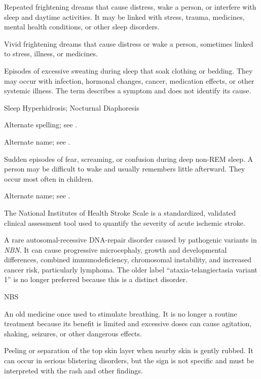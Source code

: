  Repeated frightening dreams that cause distress, wake a person, or interfere with sleep and daytime activities. It may be linked with stress, trauma, medicines, mental health conditions, or other sleep disorders.

 Vivid frightening dreams that cause distress or wake a person, sometimes linked to stress, illness, or medicines.

 Episodes of excessive sweating during sleep that soak clothing or bedding. They may occur with infection, hormonal changes, cancer, medication effects, or other systemic illness. The term describes a symptom and does not identify its cause.

\synonyms
Sleep Hyperhidrosis; Nocturnal Diaphoresis

 Alternate spelling; see .

 Alternate name; see .

 Sudden episodes of fear, screaming, or confusion during deep non-REM sleep. A person may be difficult to wake and usually remembers little afterward. They occur most often in children.

 Alternate name; see .

 The National Institutes of Health Stroke Scale is a standardized, validated
clinical assessment tool used to quantify the severity of acute ischemic stroke.

 A rare autosomal-recessive DNA-repair disorder caused by pathogenic variants in \textit{NBN}. It can cause progressive microcephaly, growth and developmental differences, combined immunodeficiency, chromosomal instability, and increased cancer risk, particularly lymphoma. The older label “ataxia-telangiectasia variant 1” is no longer preferred because this is a distinct disorder.

\synonyms
NBS

 An old medicine once used to stimulate breathing. It is no longer a routine treatment because its benefit is limited and excessive doses can cause agitation, shaking, seizures, or other dangerous effects.

 Peeling or separation of the top skin layer when nearby skin is gently rubbed. It can occur in serious blistering disorders, but the sign is not specific and must be interpreted with the rash and other findings.

